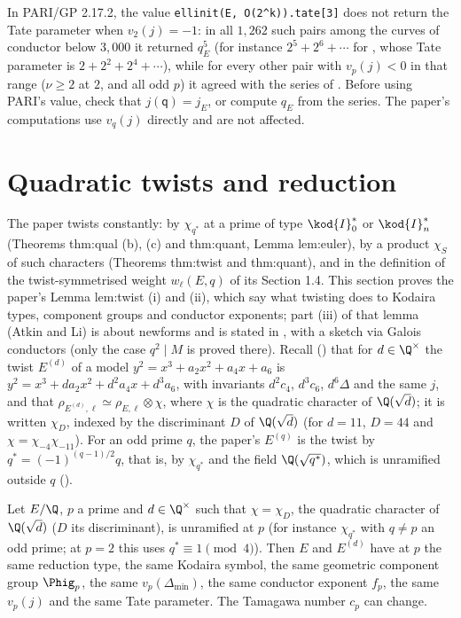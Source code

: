 \begin{warning}\label{warn:reduction:pari-tate}
In PARI/GP 2.17.2, the value \texttt{ellinit(E, O(2\^{}k)).tate[3]} does not return the Tate parameter when $v_2(j)=-1$: in all $1{,}262$ such pairs
among the curves of conductor below $3{,}000$ it returned $q_E^5$ (for instance $2^5+2^6+\cdots$ for , whose Tate parameter
is $2+2^2+2^4+\cdots$), while for every other pair with $v_p(j)<0$ in that range ($\nu\ge2$ at $2$, and all odd $p$) it agreed with the
series of . Before using PARI's value, check that $j(\mathsf q)=j_E$, or compute $q_E$ from the series.
The paper's computations use $v_q(j)$ directly and are not affected.
\end{warning}

\section{Quadratic twists and reduction}\label{sec:reduction:twists}

The paper twists constantly: by $\chi_{q^*}$ at a prime of type $\kod{I}_0^*$ or $\kod{I}_n^*$ (Theorems thm:qual (b), (c) and
thm:quant, Lemma lem:euler), by a product $\chi_S$ of such characters (Theorems thm:twist and thm:quant), and in the
definition of the twist-symmetrised weight $w_\ell(E,q)$ of its Section 1.4. This section proves the paper's Lemma
lem:twist (i) and (ii), which say what twisting does to Kodaira types, component groups and conductor exponents; part
(iii) of that lemma (Atkin and Li) is about newforms and is stated in , with a sketch via Galois conductors
(only the case $q^2\mid M$ is proved there). Recall () that
for $d\in\Q^\times$ the twist $E^{(d)}$ of a model $y^2=x^3+a_2x^2+a_4x+a_6$ is $y^2=x^3+da_2x^2+d^2a_4x+d^3a_6$, with invariants
$d^2c_4$, $d^3c_6$, $d^6\Delta$ and the same $j$, and that $\rho_{E^{(d)},\ell}\simeq\rho_{E,\ell}\otimes\chi$, where $\chi$ is the quadratic character of $\Q(\sqrt d)$; it is
written $\chi_D$, indexed by the discriminant $D$ of $\Q(\sqrt d)$ (for $d=11$, $D=44$ and $\chi=\chi_{-4}\chi_{-11}$). For an odd prime $q$, the
paper's $E^{(q)}$ is the twist by $q^*=(-1)^{(q-1)/2}q$, that is, by $\chi_{q^*}$ and the field $\Q(\sqrt{q^*})$, which is unramified
outside $q$ ().

\begin{lemma}\label{lem:reduction:twist-unramified}
Let $E/\Q$, $p$ a prime and $d\in\Q^\times$ such that $\chi=\chi_D$, the quadratic character of $\Q(\sqrt d)$ ($D$ its discriminant), is unramified at $p$ (for instance $\chi_{q^*}$ with $q\ne p$ an odd
prime; at $p=2$ this uses $q^*\equiv1\pmod4$). Then $E$ and $E^{(d)}$ have at $p$ the same reduction type, the same Kodaira
symbol, the same geometric component group $\Phig_p$, the same $v_p(\Delta_{\min})$, the same conductor exponent $f_p$, the same
$v_p(j)$ and the same Tate parameter. The Tamagawa number $c_p$ can change.
\end{lemma}


